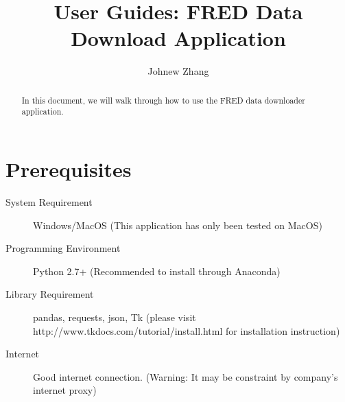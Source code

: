 \documentclass[final,12pt]{elsarticle}
\begin{document}
\begin{frontmatter}


\title{User Guides: FRED Data Download Application}




\author{Johnew Zhang}


\begin{abstract}
In this document, we will walk through how to use the FRED data downloader application.
\end{abstract}



\end{frontmatter}


\section{Prerequisites}
\begin{description}
\item[System Requirement] Windows/MacOS (This application has only been tested on MacOS)
\item[Programming Environment] Python 2.7+ (Recommended to install through Anaconda) 
\item[Library Requirement] pandas, requests, json, Tk (please visit http://www.tkdocs.com/tutorial/install.html for installation instruction)
\item[Internet] Good internet connection. (Warning: It may be constraint by company's internet proxy)
\end{description}
\end{document}
